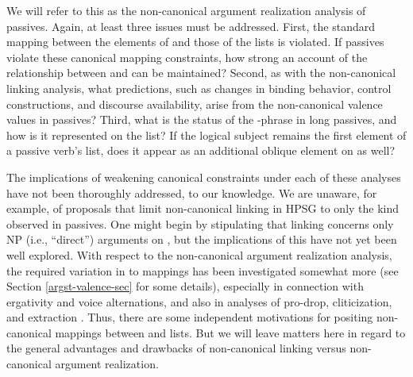 \documentclass[output=paper
	        ,collection
	        ,collectionchapter
 	        ,biblatex
                ,babelshorthands
                ,newtxmath
                ,draftmode
                ,colorlinks, citecolor=brown
]{langscibook}
\begin{document}

We will refer to this as the non-canonical argument realization analysis of passives. Again, at least three 
issues must be addressed.
First, the standard mapping between the elements of \argst and those of the \val lists is violated.
If passives violate these canonical mapping constraints, how strong an account of the relationship between \argst and \val can be maintained?
Second, as with the non-canonical linking analysis, what predictions, such as changes in binding behavior, control constructions, and discourse availability, arise from the non-canonical valence values in passives?
Third, what is the status of the -phrase in long passives, and how is it represented on the \argst list?  If the logical subject remains the first element of a passive verb's \argst list, does it appear as an additional oblique element on \argst as well? 

The implications of weakening canonical constraints under each of these analyses have not been thoroughly addressed, to our knowledge.
We are unaware, for example, of proposals that limit non-canonical linking in HPSG to only the kind observed in passives.
One might begin by stipulating that linking concerns only NP (i.e., ``direct'') arguments on \argst, but the implications of this have not yet been well explored.
With respect to the non-canonical argument realization analysis, the required variation in \argst to \val mappings has been investigated somewhat more (see Section \ref{argst-valence-sec} for some details), especially in connection with ergativity and voice alternations, and also in analyses of pro-drop, cliticization, and extraction \citep{MillerandSag1997, Manning+Sag:1999, Boumaetal2001}.
Thus, there are some independent motivations for positing non-canonical mappings between \argst and \val lists.
But we will leave matters here in regard to the general advantages and drawbacks of non-canonical linking versus non-canonical argument realization.
\end{document}
